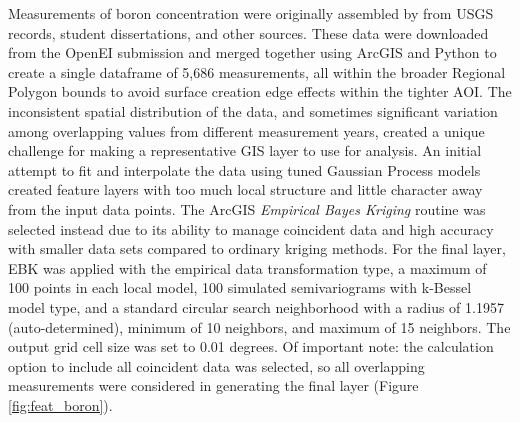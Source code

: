 Measurements of boron concentration were originally assembled by \citet{bielicki_hydrogeolgic_2015} from USGS records, student dissertations, and other sources. These data were downloaded from the OpenEI submission \citep{kelley_geothermal_2015} and merged together using ArcGIS and Python to create a single dataframe of 5,686 measurements, all within the broader Regional Polygon bounds to avoid surface creation edge effects within the tighter AOI. The inconsistent spatial distribution of the data, and sometimes significant variation among overlapping values from different measurement years, created a unique challenge for making a representative GIS layer to use for analysis. An initial attempt to fit and interpolate the data using tuned Gaussian Process models created feature layers with too much local structure and little character away from the input data points. The ArcGIS \textit{Empirical Bayes Kriging} routine was selected instead due to its ability to manage coincident data and high accuracy with smaller data sets compared to ordinary kriging methods. For the final layer, EBK was applied with the empirical data transformation type, a maximum of 100 points in each local model, 100 simulated semivariograms with k-Bessel model type, and a standard circular search neighborhood with a radius of 1.1957 (auto-determined), minimum of 10 neighbors, and maximum of 15 neighbors. The output grid cell size was set to 0.01 degrees. Of important note: the calculation option to include all coincident data was selected, so all overlapping measurements were considered in generating the final layer (Figure \ref{fig:feat_boron}).


